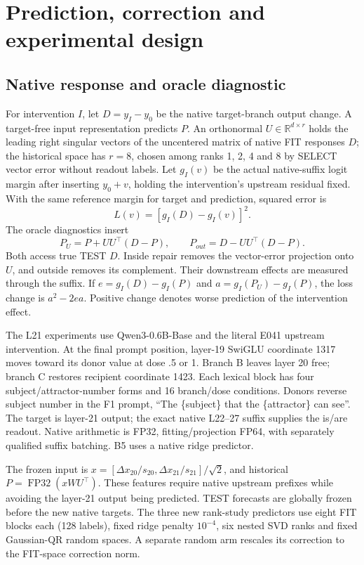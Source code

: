 \documentclass[11pt]{article}
\begin{document}
\section{Prediction, correction and experimental design}
\subsection{Native response and oracle diagnostic}
For intervention $I$, let $D=y_I-y_0$ be the native target-branch output change. A target-free input representation predicts $P$. An orthonormal $U\in\mathbb R^{d\times r}$ holds the leading right singular vectors of the uncentered matrix of native FIT responses $D$; the historical space has $r=8$, chosen among ranks 1, 2, 4 and 8 by SELECT vector error without readout labels. Let $g_I(v)$ be the actual native-suffix logit margin after inserting $y_0+v$, holding the intervention's upstream residual fixed. With the same reference margin for target and prediction, squared error is
\[
 L(v)=[g_I(D)-g_I(v)]^2.
\]
The oracle diagnostics insert
\[
 P_U=P+UU^\top(D-P),\qquad P_{out}=D-UU^\top(D-P).
\]
Both access true TEST $D$. Inside repair removes the vector-error projection onto $U$, and outside removes its complement. Their downstream effects are measured through the suffix. If $e=g_I(D)-g_I(P)$ and $a=g_I(P_U)-g_I(P)$, the loss change is $a^2-2ea$. Positive change denotes worse prediction of the intervention effect.

The L21 experiments use Qwen3-0.6B-Base and the literal E041 upstream intervention. At the final prompt position, layer-19 SwiGLU coordinate 1317 moves toward its donor value at dose .5 or 1. Branch B leaves layer 20 free; branch C restores recipient coordinate 1423. Each lexical block has four subject/attractor-number forms and 16 branch/dose conditions. Donors reverse subject number in the F1 prompt, ``The \{subject\} that the \{attractor\} can see''. The target is layer-21 output; the exact native L22--27 suffix supplies the is/are readout. Native arithmetic is FP32, fitting/projection FP64, with separately qualified suffix batching. B5 uses a native ridge predictor.

The frozen input is $x=[\Delta x_{20}/s_{20},\Delta x_{21}/s_{21}]/\sqrt2$, and historical $P=\operatorname{FP32}(xWU^\top)$. These features require native upstream prefixes while avoiding the layer-21 output being predicted. TEST forecasts are globally frozen before the new native targets. The three new rank-study predictors use eight FIT blocks each (128 labels), fixed ridge penalty $10^{-4}$, six nested SVD ranks and fixed Gaussian-QR random spaces. A separate random arm rescales its correction to the FIT-space correction norm.
\end{document}
